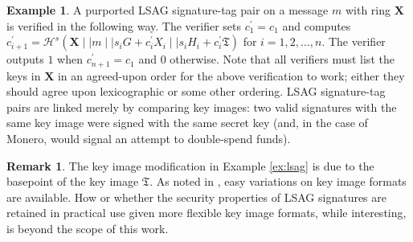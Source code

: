 \documentclass{mrl}
\theoremstyle{plain}
\theoremstyle{definition}
\newtheorem{remark}{Remark}[section]
\newtheorem{example}{Example}[section]
\begin{document}
\begin{example}
A purported LSAG signature-tag pair on a message $m$ with ring $\textbf{X}$ is verified in the following way. The verifier sets $c_1^\prime = c_1$ and computes $c_{i+1}^\prime = \mathcal{H}^s(\textbf{X} \mid \mid m \mid \mid s_i G + c_i^\prime X_i \mid \mid s_i H_i + c_i^\prime \mathfrak{T})$ for $i=1, 2, \ldots, n$. The verifier outputs $1$ when $c_{n+1}^\prime = c_1$ and $0$ otherwise. Note that all verifiers must list the keys in $\textbf{X}$ in an agreed-upon order for the above verification to work; either they should agree upon lexicographic or some other ordering.  LSAG signature-tag pairs are linked merely by comparing key images: two valid signatures with the same key image were signed with the same secret key (and, in the case of Monero, would signal an attempt to double-spend funds).
\end{example}

\begin{remark}
The key image modification in Example \ref{ex:lsag} is due to the basepoint of the key image $\mathfrak{T}$. As noted in \cite{liu2004linkable}, easy variations on key image formats are available. How or whether the security properties of LSAG signatures are retained in practical use given more flexible key image formats, while interesting, is beyond the scope of this work.
\end{remark}
\end{document}
